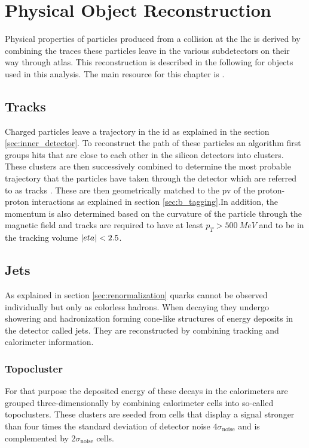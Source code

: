 \section{Physical Object Reconstruction}

Physical properties of particles produced from a collision at the \ac{lhc} is derived by combining the traces these particles leave in the various subdetectors on their way through \ac{atlas}. This  reconstruction is described in the following for objects used in this analysis. The main resource for this chapter is \citep{atlas2021optimisation}.

\subsection{Tracks}\label{sec:tracks}
Charged particles leave a trajectory in the \ac{id} as explained in the section \ref{sec:inner_detector}. To reconstruct the path of these particles an algorithm first groups hits that are close to each other in the silicon detectors into clusters. These clusters are then successively combined to determine the most probable trajectory that the particles have taken through the detector which are referred to as tracks \citep{aaboud2017performance}. These are then geometrically matched to the \ac{pv} of the proton-proton interactions as explained in section \ref{sec:b_tagging}.In addition, the momentum is also determined based on the curvature of the particle through the magnetic field and tracks are required to have at least $p_T>\qty[]{500}{MeV}$ and to be in the tracking volume $\left\vert eta\right\vert<2.5$.

\subsection{Jets}
As explained in section \ref{sec:renormalization} quarks cannot be observed individually but only as colorless hadrons. When decaying they undergo showering and hadronization forming cone-like structures of energy deposits in the detector called jets. They are reconstructed by combining tracking and calorimeter information.


\subsubsection*{Topocluster}
For that purpose the deposited energy of these decays in the calorimeters are grouped three-dimensionally by combining calorimeter cells into so-called topoclusters. These clusters are seeded from cells that display a signal stronger than four times the standard deviation of detector noise $4\sigma_\mathrm{noise}$ and is complemented by $2\sigma_\mathrm{noise}$ cells.

